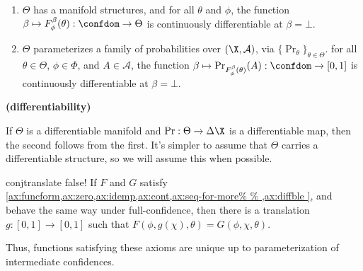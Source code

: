 \begin{CFaxioms}
	\item \label{ax:diffble}
	\begin{enumerate}
	\item $\Theta$ has a manifold structures, and
		for all $\theta$ and $\phi$, the function $\beta \mapsto F^{\beta}_\phi(\theta) : \confdom \to \Theta$
		is continuously differentiable at $\beta = \bot$. %
	\item 
		$\Theta$ parameterizes a family of probabilities over $(\X, \mathcal A)$,
		via $\{ \Pr_\theta \}_{\theta \in \Theta}$.
		for all $\theta \in \Theta$, $\phi \in \Phi$, and  $A \in \mathcal A$,
		the function $\beta \mapsto \Pr_{F^{\beta}_\phi(\theta)}(A)
		: \confdom \to \mathbb [0,1]$ is
		continuously differentiable at $\beta=\bot$. 
			\label{ax:diffble2}
	\end{enumerate}
	\hfill \textbf{(differentiability)}
\end{CFaxioms}

If $\Theta$ is a differentiable manifold and $\Pr: \Theta \to \Delta\X$ is a differentiable map, then the second follows from the first. 
It's simpler to assume that $\Theta$ carries a differentiable structure, so we will assume this when possible.










%
\begin{linked}{conj}{translate}
	{\color{red} false!}
	If 
	$F$ and $G$ satisfy
	\cref{ax:funcform,ax:zero,ax:idemp,ax:cont,ax:seq-for-more%
		},
	and behave the same way under full-confidence,
	then 
	there is a translation 
	$g: [0,1] \to [0,1]$ 
	such that
	$F(\phi, g(\chi), \theta) = G(\phi, \chi, \theta)$. 
\end{linked}
Thus, functions satisfying these axioms are unique up to parameterization
of intermediate confidences.
